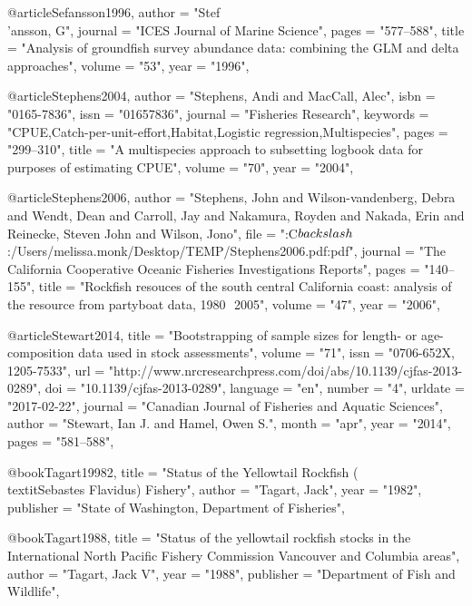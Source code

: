 @article{Sefansson1996,
    author = "{Stef\\'{a}nsson, G}",
    journal = "{ICES Journal of Marine Science}",
    pages = "{577--588}",
    title = "{{Analysis of groundfish survey abundance data: combining the GLM and delta approaches}}",
    volume = "{53}",
    year = "{1996}",
}

@article{Stephens2004,
    author = "{Stephens, Andi and MacCall, Alec}",
    isbn = "{0165-7836}",
    issn = "{01657836}",
    journal = "{Fisheries Research}",
    keywords = "{CPUE,Catch-per-unit-effort,Habitat,Logistic regression,Multispecies}",
    pages = "{299--310}",
    title = "{{A multispecies approach to subsetting logbook data for purposes of estimating CPUE}}",
    volume = "{70}",
    year = "{2004}",
}

@article{Stephens2006,
    author = "{Stephens, John and Wilson-vandenberg, Debra and Wendt, Dean and Carroll, Jay and Nakamura, Royden and Nakada, Erin and Reinecke, Steven John and Wilson, Jono}",
    file = "{:C$\\backslash$:/Users/melissa.monk/Desktop/TEMP/Stephens2006.pdf:pdf}",
    journal = "{The California Cooperative Oceanic Fisheries Investigations Reports}",
    pages = "{140--155}",
    title = "{{Rockfish resouces of the south central California coast: analysis of the resource from partyboat data, 1980  2005}}",
    volume = "{47}",
    year = "{2006}",
}

@article{Stewart2014,
    title = "{Bootstrapping of sample sizes for length- or age-composition data used in stock assessments}",
    volume = "{71}",
    issn = "{0706-652X, 1205-7533}",
    url = "{http://www.nrcresearchpress.com/doi/abs/10.1139/cjfas-2013-0289}",
    doi = "{10.1139/cjfas-2013-0289}",
    language = "{en}",
    number = "{4}",
    urldate = "{2017-02-22}",
    journal = "{Canadian Journal of Fisheries and Aquatic Sciences}",
    author = "{Stewart, Ian J. and Hamel, Owen S.}",
    month = "apr",
    year = "{2014}",
    pages = "{581--588}",
}

@book{Tagart19982,
    title = "{Status of the Yellowtail Rockfish (\\textit{{Sebastes} Flavidus}) Fishery}",
    author = "{Tagart, Jack}",
    year = "{1982}",
    publisher = "{State of Washington, Department of Fisheries}",
}

@book{Tagart1988,
    title = "{Status of the yellowtail rockfish stocks in the International North Pacific Fishery Commission Vancouver and Columbia areas}",
    author = "{Tagart, Jack V}",
    year = "{1988}",
    publisher = "{Department of Fish and Wildlife}",
}

